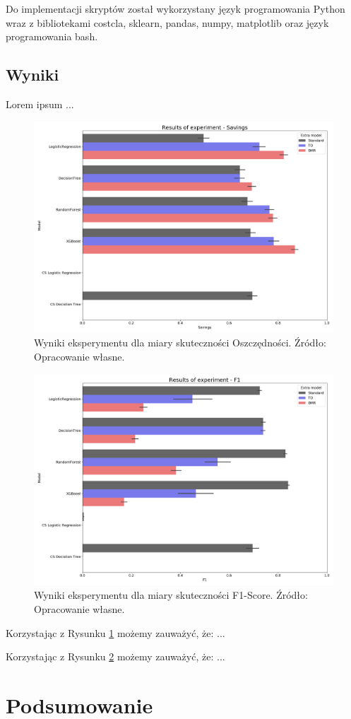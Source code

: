 \documentclass[inzynierska]{pwr_wmat_praca_dyplomowa}
\theoremstyle{plain}
\numberwithin{theorem}{chapter}
\theoremstyle{definition}
\numberwithin{theorem}{chapter}
\begin{document}
Do implementacji skryptów został wykorzystany język programowania Python wraz z bibliotekami costcla, sklearn, pandas, numpy, matplotlib oraz język programowania bash.

\section{Wyniki}
Lorem ipsum ...

\begin{figure}[h]
	\includegraphics[width=\linewidth]{images/100_config1-Savings.png}
	\caption{Wyniki eksperymentu dla miary skuteczności Oszczędności. Źródło: Opracowanie własne.}	
	\label{fig:results-savings}
\end{figure}

\begin{figure}[h]
	\includegraphics[width=\linewidth]{images/100_config1-F1.png}
	\caption{Wyniki eksperymentu dla miary skuteczności F1-Score. Źródło: Opracowanie własne.}
	\label{fig:results-f1}
\end{figure}

Korzystając z Rysunku \ref{fig:results-savings} możemy zauważyć, że: ...

Korzystając z Rysunku \ref{fig:results-f1} możemy zauważyć, że: ...	


\chapter*{Podsumowanie}


\backmatter
\nocite{*}

\end{document}
